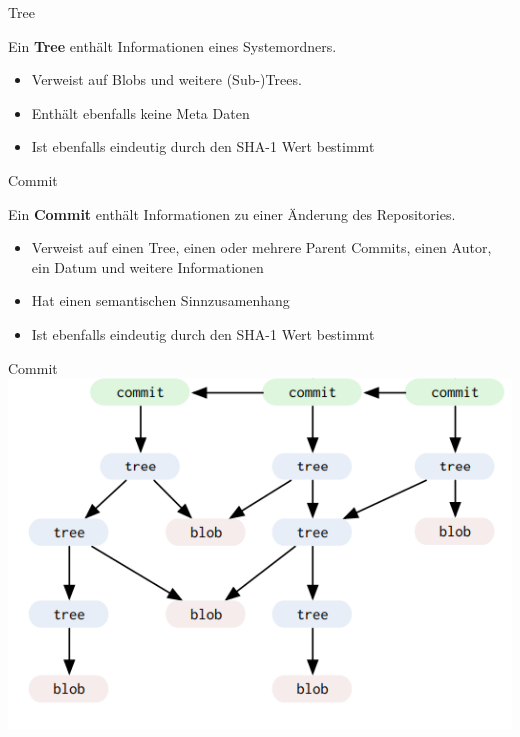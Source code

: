 \begin{frame}{Tree}
  \begin{Definition}
    Ein \textbf{Tree} enthält Informationen eines Systemordners.
  \end{Definition}
  \begin{itemize}
    \pause
    \item Verweist auf Blobs und weitere (Sub-)Trees.
    \pause
    \item Enthält ebenfalls keine Meta Daten
    \pause
    \item Ist ebenfalls eindeutig durch den SHA-1 Wert bestimmt
  \end{itemize}
\end{frame}

\begin{frame}{Commit}
  \begin{Definition}
    Ein \textbf{Commit} enthält Informationen zu einer Änderung des Repositories.
  \end{Definition}
  \begin{itemize}
    \pause
    \item Verweist auf einen Tree, einen oder mehrere \glqq Parent\grqq{} Commits, einen Autor, ein Datum und weitere Informationen
    \pause
    \item Hat einen semantischen Sinnzusamenhang
    \pause
    \item Ist ebenfalls eindeutig durch den SHA-1 Wert bestimmt
  \end{itemize}
\end{frame}

\begin{frame}{Commit}
  \includegraphics[scale=0.5]{./section/pictures/internes.png}
\end{frame}


